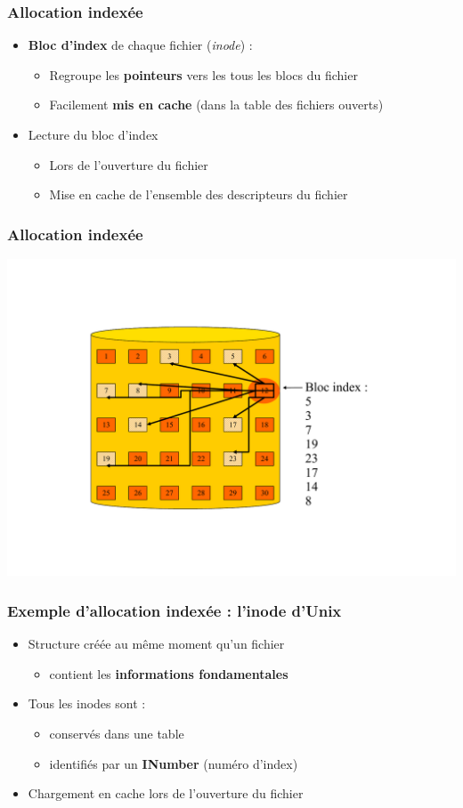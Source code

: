 \begin{frame}
\frametitle{Allocation indexée}
\begin{itemize}
\item \textbf{Bloc d'index} de chaque fichier (\textit{inode}) :
\begin{itemize}
\item Regroupe les \textbf{pointeurs} vers les tous les blocs du fichier
\item Facilement \textbf{mis en cache} (dans la table des fichiers ouverts)
\end{itemize}
\item Lecture du bloc d'index
\begin{itemize}
\item Lors de l'ouverture du fichier
\item Mise en cache de l'ensemble des descripteurs du fichier
\end{itemize}
\end{itemize}
\end{frame}

\begin{frame}
\frametitle{Allocation indexée}
\includegraphics[width=.8\textwidth]{../illustration/bloc_index.pdf}
\end{frame}

\begin{frame}
\frametitle{Exemple d'allocation indexée : l'inode d'Unix}
\begin{itemize}
\item Structure créée au même moment qu'un fichier
\begin{itemize}
\item contient les \textbf{informations fondamentales}
\end{itemize}
\item Tous les inodes sont :
\begin{itemize}
\item conservés dans une table
\item identifiés par un \textbf{INumber} (numéro d'index)
\end{itemize}
\item Chargement en cache lors de l'ouverture du fichier
\end{itemize}
\end{frame}

